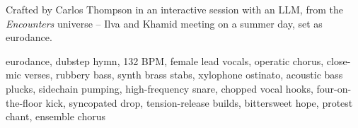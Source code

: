 

\begin{notes}
Crafted by Carlos Thompson in an interactive session with an LLM, from the \emph{Encounters} universe -- Ilva and Khamid meeting on a summer day, set as eurodance.
\end{notes}

\begin{style}
eurodance, dubstep hymn, 132 BPM, female lead vocals, operatic chorus, close-mic verses, rubbery bass, synth brass stabs, xylophone ostinato, acoustic bass plucks, sidechain pumping, high-frequency snare, chopped vocal hooks, four-on-the-floor kick, syncopated drop, tension-release builds, bittersweet hope, protest chant, ensemble chorus
\end{style}

